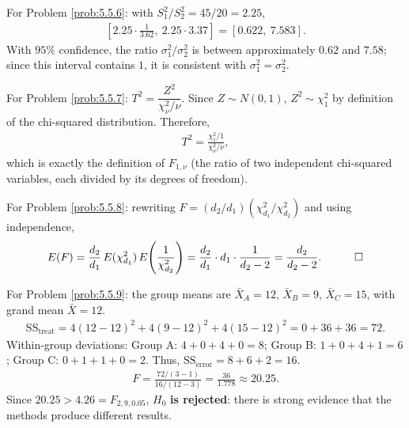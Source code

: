 \begin{solucion}
	\label{sol:5.5.6}
	For Problem \ref{prob:5.5.6}: with $S_1^2/S_2^2 = 45/20 = 2.25$,
	\begin{align*}
		\left[2.25\cdot\frac{1}{3.62},\ 2.25\cdot 3.37\right] = [0.622,\ 7.583].
	\end{align*}
	With $95\%$ confidence, the ratio $\sigma_1^2/\sigma_2^2$ is between approximately $0.62$ and $7.58$; since this interval contains $1$, it is consistent with $\sigma_1^2=\sigma_2^2$. \quad \qedhere
\end{solucion}

\begin{solucion}
	\label{sol:5.5.7}
	For Problem \ref{prob:5.5.7}: $T^2 = \dfrac{Z^2}{\chi^2_\nu/\nu}$. Since $Z\sim N(0,1)$, $Z^2\sim\chi^2_1$ by definition of the chi-squared distribution. Therefore,
	\begin{align*}
		T^2 = \frac{\chi^2_1/1}{\chi^2_\nu/\nu},
	\end{align*}
	which is exactly the definition of $F_{1,\nu}$ (the ratio of two independent chi-squared variables, each divided by its degrees of freedom). \quad \qedhere
\end{solucion}

\begin{solucion}
	\label{sol:5.5.8}
	For Problem \ref{prob:5.5.8}: rewriting $F=(d_2/d_1)(\chi^2_{d_1}/\chi^2_{d_2})$ and using independence,
	\begin{align*}
		E(F) = \frac{d_2}{d_1}\, E(\chi^2_{d_1})\, E\!\left(\frac{1}{\chi^2_{d_2}}\right) = \frac{d_2}{d_1}\cdot d_1 \cdot \frac{1}{d_2-2} = \frac{d_2}{d_2-2}. \quad \qedhere
	\end{align*}
\end{solucion}

\begin{solucion}
	\label{sol:5.5.9}
	For Problem \ref{prob:5.5.9}: the group means are $\bar X_A=12$, $\bar X_B=9$, $\bar X_C=15$, with grand mean $\bar X = 12$.
	\begin{align*}
		\text{SS}_{\text{treat}} = 4(12-12)^2+4(9-12)^2+4(15-12)^2 = 0+36+36 = 72.
	\end{align*}
	Within-group deviations: Group A: $4+0+4+0=8$; Group B: $1+0+4+1=6$; Group C: $0+1+1+0=2$. Thus, $\text{SS}_{\text{error}}=8+6+2=16$.
	\begin{align*}
		F = \frac{72/(3-1)}{16/(12-3)} = \frac{36}{1.778} \approx 20.25.
	\end{align*}
	Since $20.25 > 4.26 = F_{2,9,0.05}$, $H_0$ \textbf{is rejected}: there is strong evidence that the methods produce different results. \quad \qedhere
\end{solucion}

